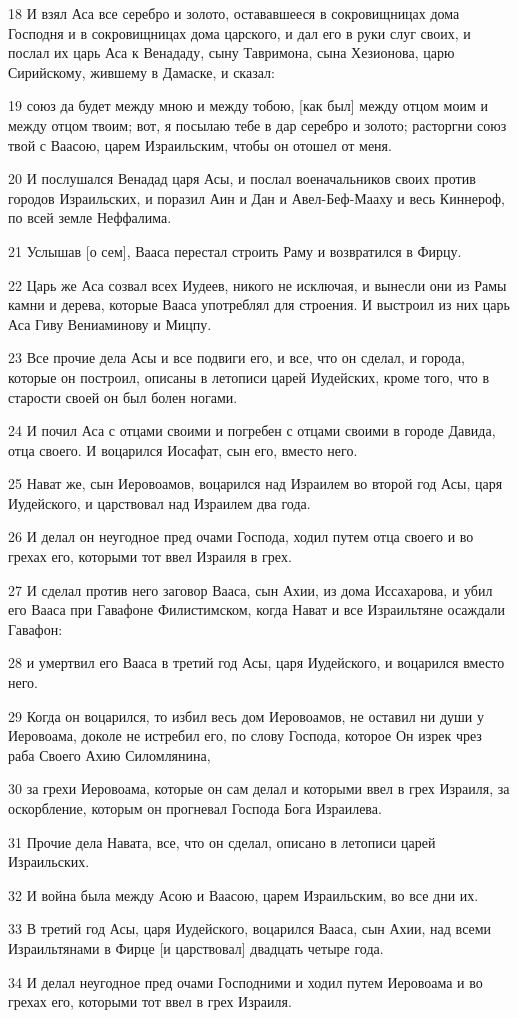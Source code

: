 \par 18 И взял Аса все серебро и золото, остававшееся в сокровищницах дома Господня и в сокровищницах дома царского, и дал его в руки слуг своих, и послал их царь Аса к Венададу, сыну Тавримона, сына Хезионова, царю Сирийскому, жившему в Дамаске, и сказал:
\par 19 союз да будет между мною и между тобою, [как был] между отцом моим и между отцом твоим; вот, я посылаю тебе в дар серебро и золото; расторгни союз твой с Ваасою, царем Израильским, чтобы он отошел от меня.
\par 20 И послушался Венадад царя Асы, и послал военачальников своих против городов Израильских, и поразил Аин и Дан и Авел-Беф-Мааху и весь Киннероф, по всей земле Неффалима.
\par 21 Услышав [о сем], Вааса перестал строить Раму и возвратился в Фирцу.
\par 22 Царь же Аса созвал всех Иудеев, никого не исключая, и вынесли они из Рамы камни и дерева, которые Вааса употреблял для строения. И выстроил из них царь Аса Гиву Вениаминову и Мицпу.
\par 23 Все прочие дела Асы и все подвиги его, и все, что он сделал, и города, которые он построил, описаны в летописи царей Иудейских, кроме того, что в старости своей он был болен ногами.
\par 24 И почил Аса с отцами своими и погребен с отцами своими в городе Давида, отца своего. И воцарился Иосафат, сын его, вместо него.
\par 25 Нават же, сын Иеровоамов, воцарился над Израилем во второй год Асы, царя Иудейского, и царствовал над Израилем два года.
\par 26 И делал он неугодное пред очами Господа, ходил путем отца своего и во грехах его, которыми тот ввел Израиля в грех.
\par 27 И сделал против него заговор Вааса, сын Ахии, из дома Иссахарова, и убил его Вааса при Гавафоне Филистимском, когда Нават и все Израильтяне осаждали Гавафон:
\par 28 и умертвил его Вааса в третий год Асы, царя Иудейского, и воцарился вместо него.
\par 29 Когда он воцарился, то избил весь дом Иеровоамов, не оставил ни души у Иеровоама, доколе не истребил его, по слову Господа, которое Он изрек чрез раба Своего Ахию Силомлянина,
\par 30 за грехи Иеровоама, которые он сам делал и которыми ввел в грех Израиля, за оскорбление, которым он прогневал Господа Бога Израилева.
\par 31 Прочие дела Навата, все, что он сделал, описано в летописи царей Израильских.
\par 32 И война была между Асою и Ваасою, царем Израильским, во все дни их.
\par 33 В третий год Асы, царя Иудейского, воцарился Вааса, сын Ахии, над всеми Израильтянами в Фирце [и царствовал] двадцать четыре года.
\par 34 И делал неугодное пред очами Господними и ходил путем Иеровоама и во грехах его, которыми тот ввел в грех Израиля.


